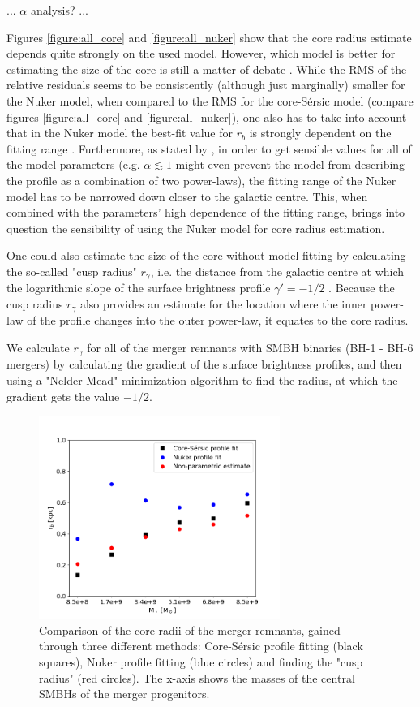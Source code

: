 \documentclass[english, oneside]{HYgradu}
\begin{document}
... $\alpha$ analysis? ...

Figures \ref{figure:all_core} and \ref{figure:all_nuker} show that the core radius estimate depends quite strongly on the used model. However, which model is better for estimating the size of the core is still a matter of debate \citep{Lauer2007, Dullo2012}. While the RMS of the relative residuals seems to be consistently (although just marginally) smaller for the Nuker model, when compared to the RMS for the core-Sérsic model (compare figures \ref{figure:all_core} and \ref{figure:all_nuker}), one also has to take into account that in the Nuker model the best-fit value for $r_b$ is strongly dependent on the fitting range \citep{Graham2003Nuker}. Furthermore, as stated by \cite{Rantala2018}, in order to get sensible values for all of the model parameters (e.g. $\alpha \lesssim 1$ might even prevent the model from describing the profile as a combination of two power-laws), the fitting range of the Nuker model has to be narrowed down closer to the galactic centre. This, when combined with the parameters' high dependence of the fitting range, brings into question the sensibility of using the Nuker model for core radius estimation.

One could also estimate the size of the core without model fitting by calculating the so-called "cusp radius" $r_\gamma$, i.e. the distance from the galactic centre at which the logarithmic slope of the surface brightness profile $\gamma' = -1/2$ \citep{Carollo1997, Lauer2007Cusp}. Because the cusp radius $r_\gamma$ also provides an estimate for the location where the inner power-law of the profile changes into the outer power-law, it equates to the core radius. 

We calculate $r_\gamma$ for all of the merger remnants with SMBH binaries (BH-1 - BH-6 mergers) by calculating the gradient of the surface brightness profiles, and then using a "Nelder-Mead" minimization algorithm to find the radius, at which the gradient gets the value $-1/2$. 

\begin{figure}[h]
	\centering
	\includegraphics[width=0.7\textwidth]{rb_mass_relation.png}
	\caption{Comparison of the core radii of the merger remnants, gained through three different methods: Core-Sérsic profile fitting (black squares), Nuker profile fitting (blue circles) and  finding the "cusp radius" (red circles). The x-axis shows the masses of the central SMBHs of the merger progenitors.}
	\label{figure:radii_comparison}
\end{figure}
\end{document}
